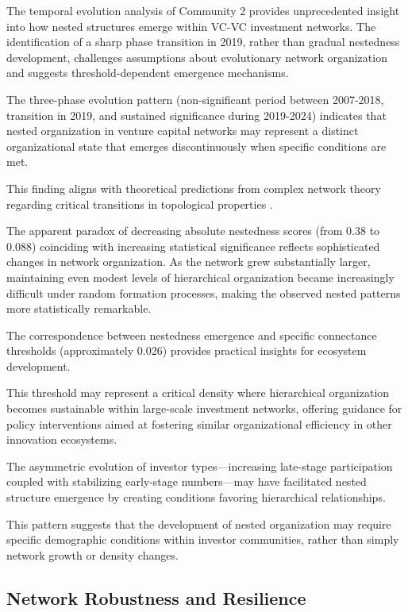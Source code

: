 
The temporal evolution analysis of Community 2 provides unprecedented insight into how nested structures emerge within VC-VC investment networks. The identification of a sharp phase transition in 2019, rather than gradual nestedness development, challenges assumptions about evolutionary network organization and suggests threshold-dependent emergence mechanisms.

The three-phase evolution pattern (non-significant period between 2007-2018, transition in 2019, and sustained significance during 2019-2024) indicates that nested organization in venture capital networks may represent a distinct organizational state that emerges discontinuously when specific conditions are met. 

This finding aligns with theoretical predictions from complex network theory regarding critical transitions in topological properties \cite{Mariani2019}.

The apparent paradox of decreasing absolute nestedness scores (from 0.38 to 0.088) coinciding with increasing statistical significance reflects sophisticated changes in network organization. As the network grew substantially larger, maintaining even modest levels of hierarchical organization became increasingly difficult under random formation processes, making the observed nested patterns more statistically remarkable. 

The correspondence between nestedness emergence and specific connectance thresholds (approximately 0.026) provides practical insights for ecosystem development. 

This threshold may represent a critical density where hierarchical organization becomes sustainable within large-scale investment networks, offering guidance for policy interventions aimed at fostering similar organizational efficiency in other innovation ecosystems.

The asymmetric evolution of investor types—increasing late-stage participation coupled with stabilizing early-stage numbers—may have facilitated nested structure emergence by creating conditions favoring hierarchical relationships. 

This pattern suggests that the development of nested organization may require specific demographic conditions within investor communities, rather than simply network growth or density changes.

\subsection{Network Robustness and Resilience}

